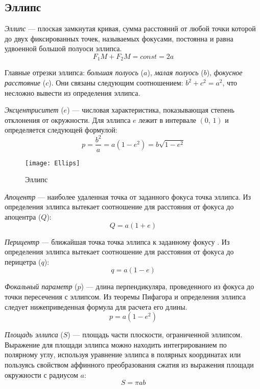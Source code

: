 \subsection{Эллипс}
\textit{Эллипс} --- плоская замкнутая кривая, сумма 
расстояний от любой точки которой до двух фиксированных 
точек, называемых фокусами, постоянна и равна 
удвоенной большой полуоси эллипса.
\begin{equation}F_1M+F_2M=const=2a
\end{equation}

Главные отрезки эллипса: {\itshape большая полуось} 
($a$), {\itshape малая полуось} ($b$), {\itshape 
фокусное расстояние} ($c$). Они связаны следующим 
соотношением: $b^2+c^2=a^2$, что несложно вывести из 
определения эллипса.

{\itshape Эксцентриситет} ($e$) --- числовая 
характеристика, показывающая степень отклонения от 
окружности. Для эллипса $e$ лежит в интервале $(0, \, 1)$ и
определяется следующей формулой:\begin{equation}
p=\frac{b^2}{a}=a(1-e^2)=b\sqrt{1-e^2}
\end{equation}

\begin{figure}[h!]
\centering
\texttt{[image: Ellips]}
\caption{Эллипс}
\end{figure}

{\itshape Апоцентр} --- наиболее удаленная точка
от заданного фокуса точка эллипса. Из определения эллипса
вытекает соотношение для расстояния от фокуса до 
апоцентра ($Q$):\begin{equation}
Q = a (1 + e)
\end{equation}

{\itshape Перицентр} --- ближайшая точка
точка эллипса к заданному фокусу . Из определения эллипса
вытекает соотношение для расстояния от фокуса до 
перицетра ($q$):\begin{equation}
q = a (1 - e)
\end{equation}

{\itshape Фокальный параметр} ($p$) --- длина перпендикуляра,
проведенного из фокуса до точки пересечения с эллипсом.
Из теоремы Пифагора и определения эллипса следует 
нижеприведенная формула для расчета его длины. 
\begin{equation}
p = a(1 - e^2)
\end{equation}

{\itshape Площадь эллипса} ($S$) --- площадь части 
плоскости, ограниченной эллипсом. Выражение для площади 
эллипса можно находить интегрированием по полярному углу, 
используя уравнение эллипса в полярных координатах или 
пользуясь свойством аффинного преобразования сжатия из 
выражения площади окружности с радиусом $a$:
\begin{equation}
S=\pi ab
\end{equation}

